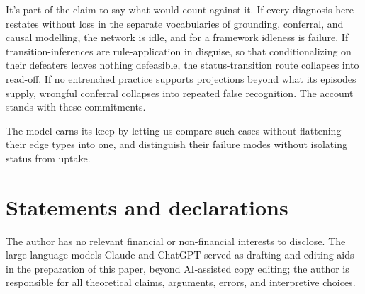 \documentclass[12pt]{article}
\begin{document}
It's part of the claim to say what would count against it. If every diagnosis here restates without loss in the separate vocabularies of grounding, conferral, and causal modelling, the network is idle, and for a framework idleness is failure. If transition-inferences are rule-application in disguise, so that conditionalizing on their defeaters leaves nothing defeasible, the status-transition route collapses into read-off. If no entrenched practice supports projections beyond what its episodes supply, wrongful conferral collapses into repeated false recognition. The account stands with these commitments.

The model earns its keep by letting us compare such cases without flattening their edge types into one, and distinguish their failure modes without isolating status from uptake.

\section*{Statements and declarations}

The author has no relevant financial or non-financial interests to disclose. The large language models Claude and ChatGPT served as drafting and editing aids in the preparation of this paper, beyond AI-assisted copy editing; the author is responsible for all theoretical claims, arguments, errors, and interpretive choices.

\newpage
\printbibliography
\end{document}
